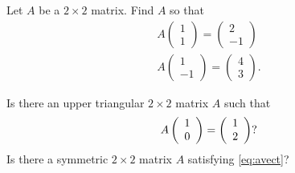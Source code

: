 \documentclass{ximera}
\begin{document}
\begin{exercise} \label{c4.1.8}
Let $A$ be a $2\times 2$ matrix.  Find $A$ so that
\begin{eqnarray*}
A\left(\begin{array}{r} 1 \\ 1 \end{array}\right) =
\left(\begin{array}{r} 2 \\ -1 \end{array}\right) \\
A\left(\begin{array}{r} 1 \\ -1 \end{array}\right) =
\left(\begin{array}{r} 4 \\ 3 \end{array}\right).
\end{eqnarray*}
\end{exercise}

\begin{exercise} \label{c4.1.9}
Is there an upper triangular $2\times 2$ matrix $A$ such that
\begin{equation}  \label{eq:avect}
A\left(\begin{array}{r} 1 \\ 0\end{array}\right) = \left(\begin{array}{r} 1 \\ 2\end{array}\right)?
\end{equation}
Is there a symmetric $2\times 2$ matrix $A$ satisfying \eqref{eq:avect}?
\end{exercise}

\CEXER
\end{document}
